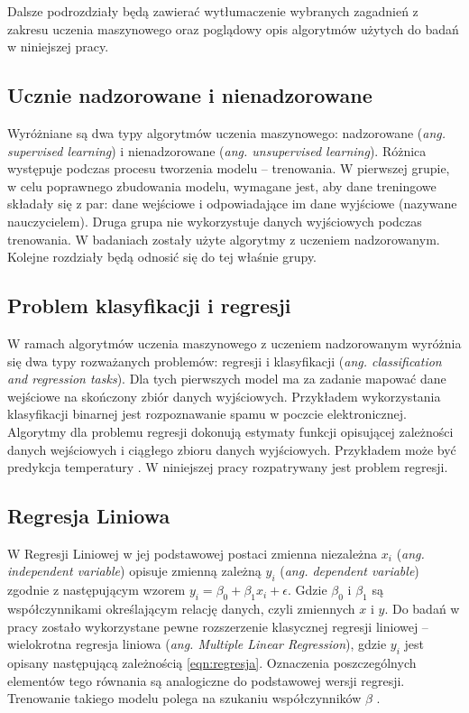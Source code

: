 Dalsze  podrozdziały będą zawierać wytłumaczenie wybranych zagadnień z zakresu uczenia maszynowego oraz poglądowy opis algorytmów użytych do badań w niniejszej pracy.

\subsection{Ucznie nadzorowane i nienadzorowane}
Wyróżniane są dwa typy algorytmów uczenia maszynowego: nadzorowane ({\em ang. supervised learning}) i nienadzorowane ({\em ang. unsupervised learning}). Różnica występuje podczas procesu tworzenia modelu -- trenowania. W pierwszej grupie, w celu poprawnego zbudowania modelu, wymagane jest, aby dane treningowe składały się z par: dane wejściowe i odpowiadające im  dane wyjściowe (nazywane nauczycielem). Druga grupa nie wykorzystuje danych wyjściowych podczas trenowania. W badaniach zostały użyte algorytmy z uczeniem nadzorowanym. Kolejne rozdziały będą odnosić się do tej właśnie grupy. \par 

\subsection{Problem klasyfikacji i regresji}
W ramach algorytmów uczenia maszynowego z uczeniem nadzorowanym wyróżnia się dwa typy rozważanych  problemów: regresji i klasyfikacji (\textit{ang. classification and regression tasks}). Dla tych pierwszych model ma za zadanie mapować dane wejściowe na skończony zbiór danych wyjściowych. Przykładem wykorzystania klasyfikacji binarnej jest rozpoznawanie spamu w poczcie elektronicznej. Algorytmy dla problemu regresji dokonują estymaty funkcji opisującej zależności danych wejściowych i ciągłego zbioru danych wyjściowych. Przykładem może być predykcja temperatury \cite{rf2}.
W niniejszej  pracy rozpatrywany  jest problem regresji. \par



\subsection{Regresja Liniowa}
W Regresji Liniowej w jej podstawowej postaci zmienna niezależna $x_i$ ({\em ang. independent variable}) opisuje zmienną zależną $y_i$ ({\em ang. dependent variable}) zgodnie z następującym wzorem $y_i = \beta_0 + \beta_1 x_i + \epsilon$. Gdzie $\beta_0$ i $\beta_1$ są współczynnikami określającym relację danych, czyli zmiennych $x$ i $y$. Do badań w pracy zostało wykorzystane pewne rozszerzenie klasycznej regresji liniowej -- wielokrotna regresja liniowa ({\em ang. Multiple Linear Regression}), gdzie $y_i$ jest opisany następującą zależnością \ref{eqn:regresja}. Oznaczenia poszczególnych elementów tego równania są analogiczne do podstawowej wersji regresji. Trenowanie takiego modelu polega na szukaniu współczynników $\beta$ \cite{mlr} .\par

